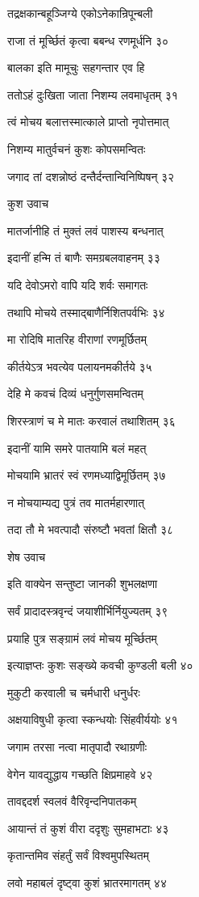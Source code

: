 तद्रक्षकान्बहूञ्जिग्ये एकोऽनेकान्रिपून्बली

राजा तं मूर्च्छितं कृत्वा बबन्ध रणमूर्धनि ३०

बालका इति मामूचुः सहगन्तार एव हि

ततोऽहं दुःखिता जाता निशम्य लवमाधृतम् ३१

त्वं मोचय बलात्तस्मात्काले प्राप्तो नृपोत्तमात्

निशम्य मातुर्वचनं कुशः कोपसमन्वितः

जगाद तां दशन्नोष्ठं दन्तैर्दन्तान्विनिष्पिषन् ३२

कुश उवाच

मातर्जानीहि तं मुक्तं लवं पाशस्य बन्धनात्

इदानीं हन्मि तं बाणैः समग्रबलवाहनम् ३३

यदि देवोऽमरो वापि यदि शर्वः समागतः

तथापि मोचये तस्माद्बाणैर्निशितपर्वभिः ३४

मा रोदिषि मातरिह वीराणां रणमूर्छितम्

कीर्तयेऽत्र भवत्येव पलायनमकीर्तये ३५

देहि मे कवचं दिव्यं धनुर्गुणसमन्वितम्

शिरस्त्राणं च मे मातः करवालं तथाशितम् ३६

इदानीं यामि समरे पातयामि बलं महत्

मोचयामि भ्रातरं स्वं रणमध्याद्विमूर्छितम् ३७

न मोचयाम्यद्य पुत्रं तव मातर्महारणात्

तदा तौ मे भवत्पादौ संरुष्टौ भवतां क्षितौ ३८

शेष उवाच

इति वाक्येन सन्तुष्टा जानकी शुभलक्षणा

सर्वं प्रादादस्त्रवृन्दं जयाशीर्भिर्नियुज्यतम् ३९

प्रयाहि पुत्र सङ्ग्रामं लवं मोचय मूर्च्छितम्

इत्याज्ञप्तः कुशः सङ्ख्ये कवची कुण्डली बली ४०

मुकुटी करवाली च चर्मधारी धनुर्धरः

अक्षयाविषुधी कृत्वा स्कन्धयोः सिंहवीर्ययोः ४१

जगाम तरसा नत्वा मातृपादौ रथाग्रणीः

वेगेन यावद्युद्धाय गच्छति क्षिप्रमाहवे ४२

तावद्ददर्श स्वलवं वैरिवृन्दनिपातकम्

आयान्तं तं कुशं वीरा ददृशुः सुमहाभटाः ४३

कृतान्तमिव संहर्तुं सर्वं विश्वमुपस्थितम्

लवो महाबलं दृष्ट्वा कुशं भ्रातरमागतम् ४४

